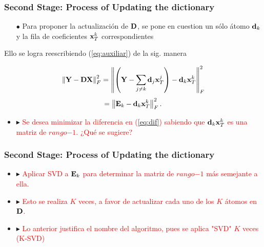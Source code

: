 \documentclass[spanish,xcolor=dvipsnames]{beamer}
\begin{document}

\begin {frame}
	\frametitle{Second Stage: Process of Updating the dictionary}

	\begin{itemize}
		\item[\color {black} \bf $\bullet$] Para proponer la actualización de ${\bf D}$, se pone en cuestion un sólo átomo ${\bf d}_k$ y la fila de coeficientes ${\bf x}_T^k$ correspondientes
	\end{itemize} 

Ello se logra reescribiendo (\ref{eq:auxiliar}) de la sig. manera

	\begin{equation} 
		\nonumber \left \| {\bf Y} - {\bf DX} \right \|_F^2 = \left\| \left( {\bf Y} - \sum_{j \ne k} {\bf d}_j {\bf x}_T^j \right) - {\bf d}_k {\bf x}_T^k \right\|_F^2  \end{equation}
	\begin{equation} \label{eq:dif}
 		= \left \| {\bf E}_k - {\bf d}_k {\bf x}_T^k \right \|_F^2.
	\end{equation}

	\begin {itemize}
		\item [\color {red} \bf $\blacktriangleright$] \textcolor{red} {Se desea minimizar la diferencia en (\ref{eq:dif}) sabiendo que ${\bf d}_k{\bf x}_T^k$ es una matriz de $rango$$-$$1$. ¿Qué se sugiere?}
	\end{itemize}
\end{frame}

\begin{frame}
	\frametitle{Second Stage: Process of Updating the dictionary}
	
	\begin {itemize}
		\item [\color {red} \bf $\blacktriangleright$] \textcolor{red} {Aplicar SVD a ${\bf E}_k$ para determinar la matriz de $rango$$-$$1$ más semejante a ella.}
		\item [\color {red} \bf $\blacktriangleright$] \textcolor{red} {Esto se realiza $K$ veces, a favor de actualizar cada uno de los $K$ átomos en ${\bf D}$.} 
		\item [\color {red} \bf $\blacktriangleright$] \textcolor{red} {Lo anterior justifica el nombre del algoritmo, pues se aplica "SVD" $K$ veces (K-SVD)}
	\end{itemize}


\end{frame}
\end{document}

